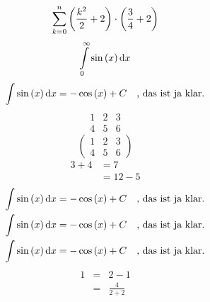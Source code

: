 \documentclass{article}
\begin{document}
\begin{equation}
	\sum_{k=0}^{n}\left(\frac{k^2}{2}+2\right)\cdot\left(\frac{3}{4}+2\right)
\end{equation}
\begin{equation}
	\int\limits_{0}^{\infty}\sin\left(x\right)\text{d}x
\end{equation}
\begin{equation}
	\int\sin\left(x\right)\text{d}x=-\cos\left(x\right)+C\quad\text{, das ist ja klar.}
\end{equation}
\begin{equation}
	\begin{matrix}
		1 & 2 & 3 \\
		4 & 5 & 6
	\end{matrix}\nonumber
\end{equation}
\begin{equation*}
	\begin{pmatrix}
		1 & 2 & 3 \\
		4 & 5 & 6
	\end{pmatrix}
\end{equation*}
\begin{equation}
\begin{split}
	3 + 4 & = 7 \\
	& = 12 - 5
\end{split}
\end{equation}
\begin{multline}
\int\sin\left(x\right)\text{d}x=-\cos\left(x\right)+C\quad\text{, das ist ja klar.}\\
\int\sin\left(x\right)\text{d}x=-\cos\left(x\right)+C\quad\text{, das ist ja klar.}\\
\int\sin\left(x\right)\text{d}x=-\cos\left(x\right)+C\quad\text{, das ist ja klar.}
\end{multline}
\begin{eqnarray}
	1 & = & 2-1 \nonumber \\
	  & = & \frac{4}{2+2}
\end{eqnarray}
\end{document}
